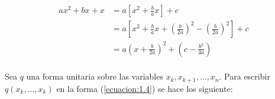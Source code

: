 \begin{equation}
\begin{split}
ax^{2} + bx + x & = a\left[x^{2} + \frac{b}{a}x \right] + c\\
 & = a\left[x^{2} + \frac{b}{a}x + \left(\frac{b}{2a}\right)^{2} - \left(\frac{b}{2a}\right)^{2} \right] + c\\
 & = a\left(x + \frac{b}{2a}\right)^{2} + \left(c - \frac{b^{2}}{4a} \right)
\end{split}
\label{ecuacion:2.2}
\end{equation}

\paragraph{}
Sea $q$ una forma unitaria sobre las variables $x_{k}, x_{k+1}, \ldots, x_{n}$. Para escribir $q\left(x_{k},\ldots,x_{k}\right)$ en la forma (\ref{ecuacion:1.4}) se hace los siguiente:

